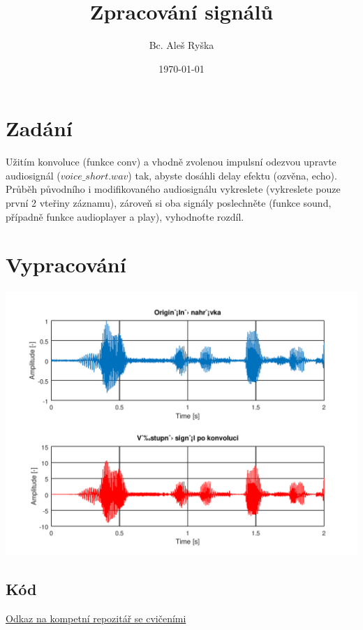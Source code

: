 \documentclass{article}
\title{Zpracování signálů} %
\author{Bc. Aleš Ryška} %
\date{\today} %
\begin{document}
\maketitle %



\section{Zadání}
Užitím konvoluce (funkce conv) a vhodně zvolenou impulsní odezvou upravte audiosignál ($voice\_short.wav$) tak, abyste dosáhli delay efektu (ozvěna, echo).\\
Průběh původního i modifikovaného audiosignálu vykreslete (vykreslete pouze první 2 vteřiny záznamu), zároveň si oba signály poslechněte (funkce sound, případně funkce audioplayer a play), vyhodnoťte rozdíl.
\newpage
\section{Vypracování}
\includegraphics[scale=0.5]{../img/img.png}
\subsection{Kód}

\href{https://github.com/AleshR/AP8ZS}{Odkaz na kompetní repozitář se cvičeními}
\end{document}

